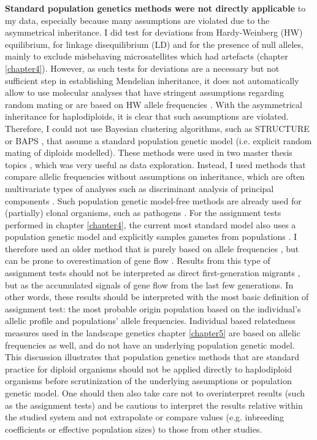 \documentclass[10pt, twoside]{book} %
\begin{document}
	\textbf{Standard population genetics methods were not directly applicable} to my data, especially because many assumptions are violated due to the asymmetrical inheritance. I did test for deviations from Hardy-Weinberg (HW) equilibrium, for linkage disequilibrium (LD) and for the presence of null alleles, mainly to exclude misbehaving microsatellites which had artefacts (chapter \ref{chapter4}). However, as such tests for deviations are a necessary but not sufficient step in establishing Mendelian inheritance, it does not automatically allow to use molecular analyses that have stringent assumptions regarding random mating or are based on HW allele frequencies \citep{waples2015}. With the asymmetrical inheritance for haplodiploids, it is clear that such assumptions are violated. Therefore, I could not use Bayesian clustering algorithms, such as STRUCTURE \citep{pritchard2000} or BAPS \citep{corander2008}, that assume a standard population genetic model (i.e. explicit random mating of diploids modelled). These methods were used in two master thesis topics \citep{gallin2021, delafonteyne2022}, which was very useful as data exploration. Instead, I used methods that compare allelic frequencies without assumptions on inheritance, which are often multivariate types of analyses such as discriminant analysis of principal components \citep[DAPC;][]{jombart2010}. Such population genetic model-free methods are already used for (partially) clonal organisms, such as pathogens \citep{grunwald2011}. For the assignment tests performed in chapter \ref{chapter4}, the current most standard model also uses a population genetic model and explicitly samples gametes from populations \citep{paetkau2004}. I therefore used an older method that is purely based on allele frequencies \citep{rannala1997}, but can be prone to overestimation of gene flow \citep{paetkau2004, piry2004}. Results from this type of assignment tests should not be interpreted as direct first-generation migrants \citep{paetkau2004}, but as the accumulated signals of gene flow from the last few generations. In other words, these results should be interpreted with the most basic definition of assignment test: the most probable origin population based on the individual's allelic profile and populations' allele frequencies. Individual based relatedness measures used in the landscape genetics chapter \ref{chapter5} are based on allelic frequencies as well, and do not have an underlying population genetic model. This discussion illustrates that population genetics methods that are standard practice for diploid organisms should not be applied directly to haplodiploid organisms before scrutinization of the underlying assumptions or population genetic model. One should then also take care not to overinterpret results (such as the assignment tests) and be cautious to interpret the results relative within the studied system and not extrapolate or compare values (e.g. inbreeding coefficients or effective population sizes) to those from other studies.\\
	
\end{document}
